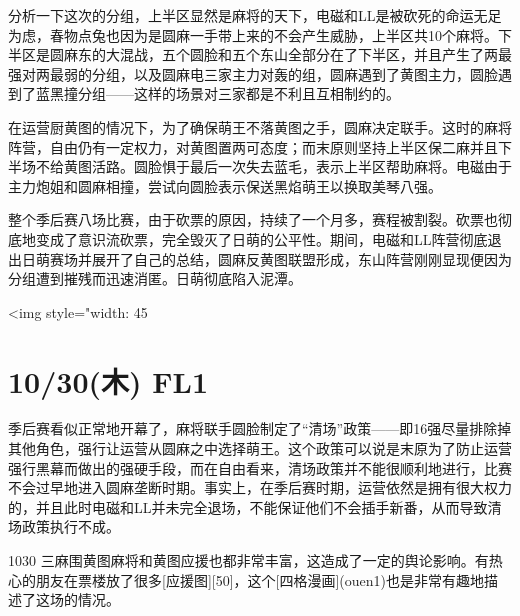 分析一下这次的分组，上半区显然是麻将的天下，电磁和LL是被砍死的命运无足为虑，春物点兔也因为是圆麻一手带上来的不会产生威胁，上半区共10个麻将。下半区是圆麻东的大混战，五个圆脸和五个东山全部分在了下半区，并且产生了两最强对两最弱的分组，以及圆麻电三家主力对轰的组，圆麻遇到了黄图主力，圆脸遇到了蓝黑撞分组——这样的场景对三家都是不利且互相制约的。

在运营厨黄图的情况下，为了确保萌王不落黄图之手，圆麻决定联手。这时的麻将阵营，自由仍有一定权力，对黄图置两可态度；而末原则坚持上半区保二麻并且下半场不给黄图活路。圆脸惧于最后一次失去蓝毛，表示上半区帮助麻将。电磁由于主力炮姐和圆麻相撞，尝试向圆脸表示保送黑焰萌王以换取美琴八强。

整个季后赛八场比赛，由于砍票的原因，持续了一个月多，赛程被割裂。砍票也彻底地变成了意识流砍票，完全毁灭了日萌的公平性。期间，电磁和LL阵营彻底退出日萌赛场并展开了自己的总结，圆麻反黄图联盟形成，东山阵营刚刚显现便因为分组遭到摧残而迅速消匿。日萌彻底陷入泥潭。

<img style="width: 45%

\section{10/30(木) FL1}


季后赛看似正常地开幕了，麻将联手圆脸制定了“清场”政策——即16强尽量排除掉其他角色，强行让运营从圆麻之中选择萌王。这个政策可以说是末原为了防止运营强行黑幕而做出的强硬手段，而在自由看来，清场政策并不能很顺利地进行，比赛不会过早地进入圆麻垄断时期。事实上，在季后赛时期，运营依然是拥有很大权力的，并且此时电磁和LL并未完全退场，不能保证他们不会插手新番，从而导致清场政策执行不成。

1030 三麻围黄图麻将和黄图应援也都非常丰富，这造成了一定的舆论影响。有热心的朋友在票楼放了很多[应援图][50]，这个[四格漫画](ouen1)也是非常有趣地描述了这场的情况。

